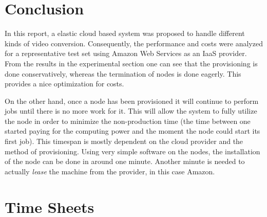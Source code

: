 \documentclass[a4paper]{IEEEtran}
\begin{document}
\section{Conclusion}

In this report, a elastic cloud based system was proposed to handle different kinds of video conversion.
Consequently, the performance and costs were analyzed for a representative test set using Amazon Web Services as an IaaS provider.
From the results in the experimental section one can see that the provisioning is done conservatively, whereas the termination of nodes is done eagerly.
This provides a nice optimization for costs.

On the other hand, once a node has been provisioned it will continue to perform jobs until there is no more work for it. 
This will allow the system to fully utilize the node in order to minimize the non-production time (the time between one started paying for the computing power and the moment the node could start its first job).
This timespan is mostly dependent on the cloud provider and the method of provisioning.
Using very simple software on the nodes, the installation of the node can be done in around one minute.
Another minute is needed to actually \textit{lease} the machine from the provider, in this case Amazon.


\appendix
\section{Time Sheets}
\end{document}
